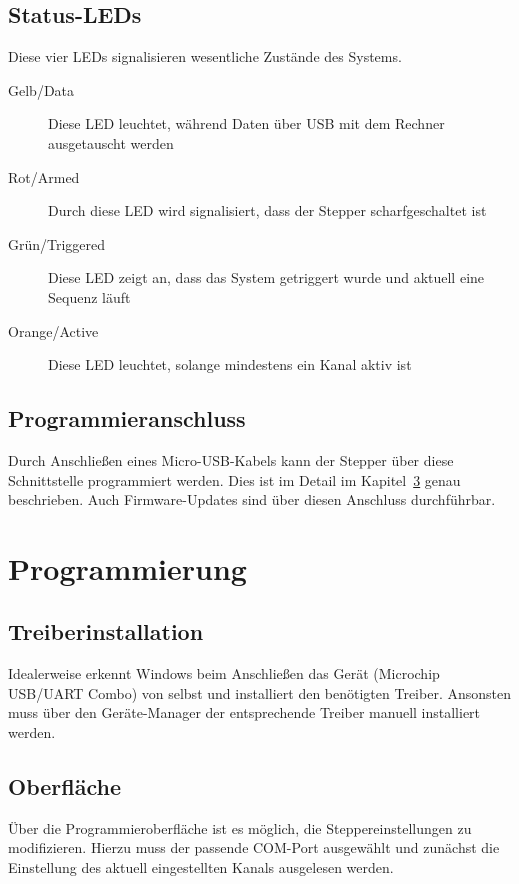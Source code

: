 \documentclass[paper=a4, open=any]{scrbook}
\begin{document}
			\section{Status-LEDs}
				Diese vier LEDs signalisieren wesentliche Zustände des Systems.
				\begin{description}
					\item[Gelb/Data] Diese LED leuchtet, während Daten über USB mit dem Rechner ausgetauscht werden
					\item[Rot/Armed] Durch diese LED wird signalisiert, dass der Stepper scharfgeschaltet ist
					\item[Grün/Triggered] Diese LED zeigt an, dass das System getriggert wurde und aktuell eine Sequenz läuft
					\item[Orange/Active] Diese LED leuchtet, solange mindestens ein Kanal aktiv ist
				\end{description}

			\section{Programmieranschluss}
				Durch Anschließen eines Micro-USB-Kabels kann der Stepper über diese Schnittstelle programmiert werden. Dies ist im Detail im Kapitel~\ref{sec:gui} genau beschrieben. Auch Firmware-Updates sind über diesen Anschluss durchführbar.

		\chapter{Programmierung}
			\label{sec:gui}
			\section{Treiberinstallation}
				Idealerweise erkennt Windows beim Anschließen das Gerät (Microchip USB/UART Combo) von selbst und installiert den benötigten Treiber. Ansonsten muss über den Geräte-Manager der entsprechende Treiber manuell installiert werden.

			\section{Oberfläche}
				Über die Programmieroberfläche ist es möglich, die Steppereinstellungen zu modifizieren. Hierzu muss der passende COM-Port ausgewählt und zunächst die Einstellung des aktuell eingestellten Kanals ausgelesen werden.
\end{document}
